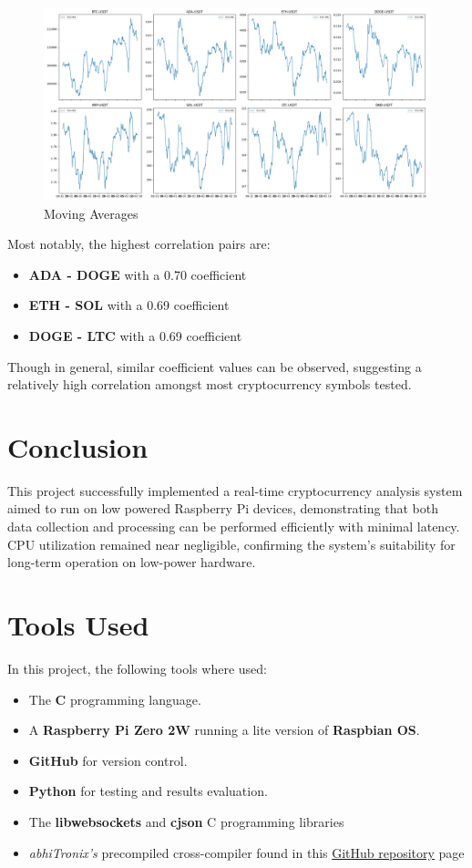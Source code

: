 \documentclass[12pt]{article}
\begin{document}
        \begin{figure}[!h]
            \centering
            \includegraphics[width=0.7\linewidth]{../results/moving_averages.png}
            \caption{Moving Averages}
            \label{fig:mavg}
        \end{figure}
        
        Most notably, the highest correlation pairs are:
        \begin{itemize}
            \item \textbf{ADA - DOGE} with a 0.70 coefficient
            \item \textbf{ETH - SOL} with a 0.69 coefficient
            \item \textbf{DOGE - LTC} with a 0.69 coefficient
        \end{itemize}

        Though in general, similar coefficient values can be observed, suggesting a relatively high correlation amongst most cryptocurrency symbols tested.

\section{Conclusion}
    This project successfully implemented a real-time cryptocurrency analysis system aimed to run on low powered Raspberry Pi devices, 
    demonstrating that both data collection and processing can be performed efficiently with minimal latency. CPU utilization remained 
    near negligible, confirming the system's suitability for long-term operation on low-power hardware.

\section{Tools Used}
    In this project, the following tools where used:
    \begin{itemize}
        \item The \textbf{C} programming language.
        \item A \textbf{Raspberry Pi Zero 2W} running a lite version of \textbf{Raspbian OS}.
        \item \textbf{GitHub} for version control.
        \item \textbf{Python} for testing and results evaluation.
        \item The \textbf{libwebsockets} and \textbf{cjson} C programming libraries
        \item \textit{abhiTronix's} precompiled cross-compiler found in this \textcolor{blue}{\href{https://github.com/abhiTronix/raspberry-pi-cross-compilers/wiki/}{GitHub repository}} page
    \end{itemize}
\end{document}
